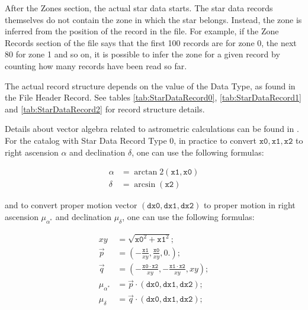 After the Zones section, the actual star data starts. The star data
records themselves do not contain the zone in which the star belongs.
Instead, the zone is inferred from the position of the record in the
file. For example, if the Zone Records section of the file says that the
first 100 records are for zone 0, the next 80 for zone 1 and so on, it
is possible to infer the zone for a given record by counting how many
records have been read so far.

The actual record structure depends on the value of the Data Type, as
found in the File Header Record.
See tables 
\ref{tab:StarDataRecord0}, \ref{tab:StarDataRecord1} and \ref{tab:StarDataRecord2}
for record structure details.

Details about vector algebra related to astrometric calculations can be 
found in \citep{2012asas.book.....V}. For the catalog with Star Data Record 
Type 0, in practice to convert $\mathtt{x0}, \mathtt{x1}, \mathtt{x2}$ to 
right ascension $\alpha$ and declination $\delta$, one can use the following 
formulas:

\begin{equation}
\begin{aligned}
\alpha &= \arctan2(\mathtt{x1}, \mathtt{x0})\\
\delta &= \arcsin(\mathtt{x2})
\end{aligned}
\end{equation}

and to convert proper motion vector $(\mathtt{dx0}, \mathtt{dx1}, \mathtt{dx2})$ to 
proper motion in right ascension $\mu_{\alpha^*}$ and declination $\mu_{\delta}$, 
one can use the following formulas:

\begin{equation}
\begin{aligned}
	xy &= \sqrt{\mathtt{x0}^2 + \mathtt{x1}^2}; \\
	\vec{p} &= \left(-\frac{\mathtt{x1}}{xy}, \frac{\mathtt{x0}}{xy}, 0.\right); \\
	\vec{q} &= \left(-\frac{\mathtt{x0} \cdot \mathtt{x2}}{xy}, -\frac{\mathtt{x1} \cdot \mathtt{x2}}{xy}, xy\right);\\
	\mu_{\alpha^*} &= \vec{p} \cdot \left(\mathtt{dx0}, \mathtt{dx1}, \mathtt{dx2}\right); \\
	\mu_{\delta} &= \vec{q} \cdot \left(\mathtt{dx0}, \mathtt{dx1}, \mathtt{dx2}\right);
\end{aligned}
\end{equation}

